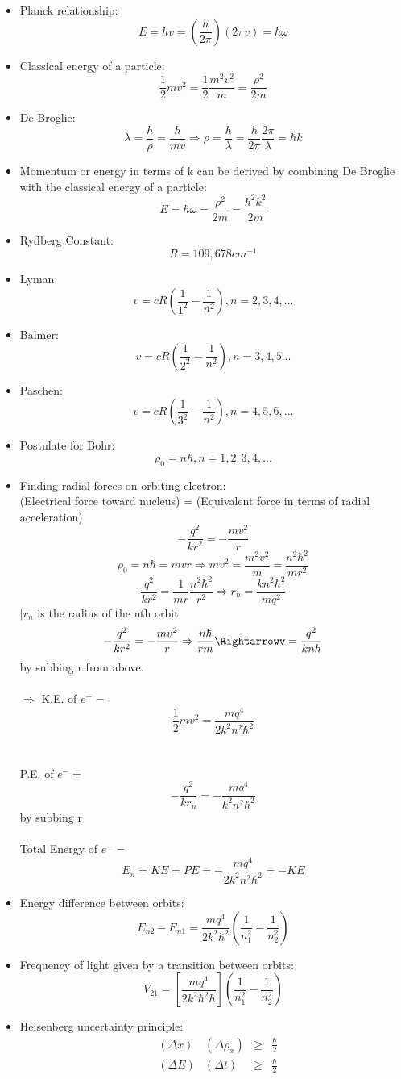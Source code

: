 \documentclass{article}
\begin{document}
\begin{itemize}
\item Planck relationship: $$ E=hv = (\frac{h}{2 \pi})(2 \pi v) = \hbar \omega$$
\item Classical energy of a particle: $$\frac{1}{2}mv^2 = \frac{1}{2}\frac{m^2v^2}{m}=\frac{\rho^2}{2m}$$
\item De Broglie: $$\lambda = \frac{h}{\rho} = \frac{h}{mv}\Rightarrow\rho=\frac{h}{\lambda}=\frac{h}{2\pi}\frac{2\pi}{\lambda}=\hbar k$$
\item Momentum or energy in terms of k can be derived by combining De Broglie with the classical energy of a particle:$$E=\hbar\omega=\frac{\rho^2}{2m}=\frac{\hbar^2 k^2}{2m}$$
\item Rydberg Constant: $$R=109,678cm^{-1}$$
\item Lyman: $$v=cR(\frac{1}{1^2}-\frac{1}{n^2}), n=2,3,4,...$$
\item Balmer: $$v=cR(\frac{1}{2^2}-\frac{1}{n^2}),n=3,4,5...$$
\item Paschen: $$v=cR(\frac{1}{3^2}-\frac{1}{n^2}),n=4,5,6,...$$
\item Postulate for Bohr:$$\rho_0=n\hbar,n=1,2,3,4,...$$
\item Finding radial forces on orbiting electron:\\(Electrical force toward nucleus) = (Equivalent force in terms of radial acceleration)\\$$-\frac{q^2}{kr^2}=-\frac{mv^2}{r}$$
$$\rho_0=n\hbar=mvr  \Rightarrow mv^2=\frac{m^2v^2}{m}=\frac{n^2\hbar^2}{mr^2}$$ $$\frac{q^2}{kr^2}=\frac{1}{mr}\frac{n^2\hbar^2}{r^2}\Rightarrow r_n=\frac{kn^2\hbar^2}{mq^2}$$ $|r_n$ is the radius of the nth orbit
$$-\frac{q^2}{kr^2}=-\frac{mv^2}{r}\Rightarrow \frac{n\hbar}{rm}\Rightarrowv=\frac{q^2}{kn\hbar}$$by subbing r from above.  \\\\$\Rightarrow$ K.E. of $e^-=$$$\frac{1}{2}mv^2=\frac{mq^4}{2k^2n^2\hbar^2}$$\\\\P.E. of $e^-=$$$-\frac{q^2}{kr_n}=-\frac{mq^4}{k^2n^2\hbar^2}$$ by subbing r\\\\Total Energy of $e^-=$$$E_n=KE=PE=-\frac{mq^4}{2k^2n^2\hbar^2}=-KE$$
\item Energy difference between orbits: $$E_{n2}-E_{n1}=\frac{mq^4}{2k^2\hbar^2}(\frac{1}{n_1^2}-\frac{1}{n_2^2})$$
\item Frequency of light given by a transition between orbits:$$V_{21}=\left[\frac{mq^4}{2k^2\hbar^2h}\right](\frac{1}{n_1^2}-\frac{1}{n_2^2})$$
\item Heisenberg uncertainty principle:\\
\begin{align}
\label{Heisenberg}
&(\Delta x)&(\Delta \rho_x)& \ge&\frac{\hbar}{2}\\
\label{Heisenberg part 2}
&(\Delta E)&(\Delta t)&\ge&\frac{\hbar}{2}
\end{align}
\end{itemize}
\end{document}
